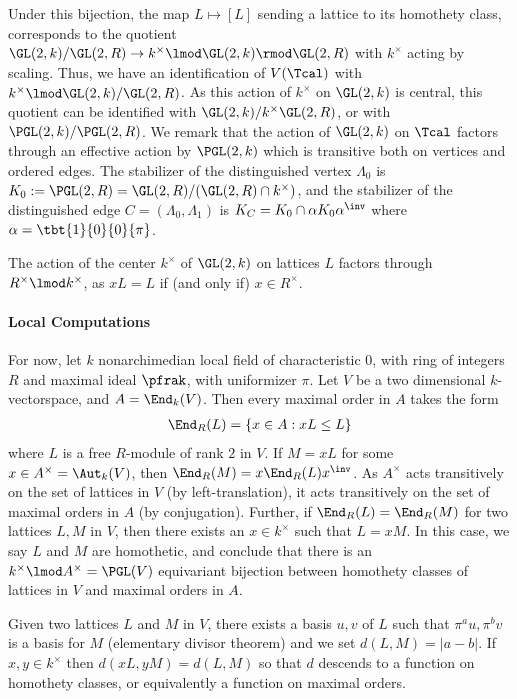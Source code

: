 \documentclass[draft]{article}
\begin{document}
Under this bijection, the map $L\mapsto [L]$ sending a lattice to its homothety class, corresponds to the quotient $\GL(2,k) / \GL(2,R) \to k^\times \lmod \GL(2,k) \rmod \GL(2,R)$ with $k^\times$ acting by scaling. Thus, we have an identification of $V(\Tcal)$ with $k^\times \lmod \GL(2,k)/\GL(2,R)$. As this action of $k^\times$ on $\GL(2,k)$ is central, this quotient can be identified with $\GL(2,k)/k^\times\GL(2,R)$, or with $\PGL(2,k)/\PGL(2,R)$. We remark that the action of $\GL(2,k)$ on $\Tcal$ factors through an effective action by $\PGL(2,k)$ which is transitive both on vertices and ordered edges. The stabilizer of the distinguished vertex $\Lambda_0$ is $K_0:=\PGL(2,R) = \GL(2,R)/(\GL(2,R)\cap k^\times)$, and the stabilizer of the distinguished edge $C = (\Lambda_0,\Lambda_1)$ is $K_C=K_0\cap \alpha K_0\alpha^\inv$ where $\alpha = \tbt{1}{0}{0}{\pi}$.



\begin{remark}
    \begin{enumerate*}
        \item The action of the center $k^\times$ of $\GL(2,k)$ on lattices $L$ factors through $R^\times \lmod k^\times $, as $xL = L$  if (and only if) $x \in R^\times$. 
    \end{enumerate*}
\end{remark}
 


\paragraph*{Local Computations} 
For now, let $k$ nonarchimedian local field of characteristic $0$, with ring of integers $R$ and maximal ideal $\pfrak$, with uniformizer $\pi$. Let $V$ be a two dimensional $k$-vectorspace, and $A = \End_k(V)$. Then every maximal order in $A$ takes the form 
\begin{align*}
    \End_R(L) = \{ x \in A : xL\leq L\}
\end{align*}
where $L$ is a free $R$-module of rank $2$ in $V$. If $M = xL$ for some $x\in A^\times = \Aut_k(V)$, then $\End_R(M) = x\End_R(L)x^\inv$. As $A^\times$ acts transitively on the set of lattices in $V$ (by left-translation), it acts transitively on the set of maximal orders in $A$ (by conjugation). Further, if $\End_R(L)=\End_R(M)$ for two lattices $L,M$ in $V$, then there exists an $x \in k^\times$ such that $L = x M$. In this case, we say $L$ and $M$ are homothetic, and conclude that there is an $k^\times \lmod A^\times = \PGL(V)$ equivariant bijection between homothety classes of lattices in $V$ and maximal orders in $A$. 

Given two lattices $L$ and $M$ in $V$, there exists a basis $u,v$ of $L$ such that $\pi^a u , \pi^b v$ is a basis for $M$ (elementary divisor theorem) and we set $d(L,M) = |a-b|$. If $x,y\in k^\times$ then $d(xL,yM)=d(L,M)$ so that $d$ descends to a function on homothety classes, or equivalently a function on maximal orders. 


\cite{sallyFourierTransformOrbital1983}


\end{document}
